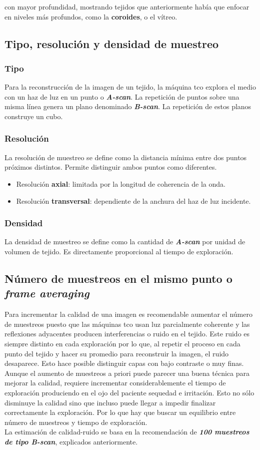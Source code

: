 con mayor profundidad, mostrando tejidos que anteriormente
había que enfocar en niveles más profundos, como la
\textbf{\gls{coroides}}, o el vítreo.

\subsection{Tipo, resolución y densidad de muestreo}
\subsubsection{Tipo}
Para la reconstrucción de la imagen de un tejido, la máquina \gls{tco}
explora el medio con un haz de luz en un punto o
\emph{\textbf{A-scan}}. La repetición de puntos sobre una misma línea
genera un plano denominado \emph{\textbf{B-scan}}. La repetición de
estos planos construye un cubo.
\subsubsection{Resolución}
La resolución de muestreo se define como la distancia mínima entre dos
puntos próximos distintos. Permite distinguir ambos puntos como
diferentes.
\begin{itemize}
\item Resolución \textbf{axial}: limitada por la longitud de
  coherencia de la onda.
\item Resolución \textbf{transversal}: dependiente de la anchura del
  haz de luz incidente.
\end{itemize}
\subsubsection{Densidad}
La densidad de muestreo se define como la cantidad de
\emph{\textbf{A-scan}} por unidad de volumen de tejido. Es
directamente proporcional al tiempo de exploración.

\subsection{Número de muestreos en el mismo punto o \emph{frame
    averaging}}
Para incrementar la calidad de una imagen es recomendable aumentar el
número de muestreos puesto que las máquinas \gls{tco} usan luz
parcialmente coherente y las reflexiones adyacentes producen
interferencias o ruido en el tejido. Este ruido es siempre distinto en
cada exploración por lo que, al repetir el proceso en cada punto del
tejido y hacer su promedio para reconstruir la imagen, el ruido
desaparece. Esto hace posible distinguir capas con bajo contraste o
muy finas.\\
Aunque el aumento de muestreos a priori puede parecer una buena
técnica para mejorar la calidad, requiere incrementar
considerablemente el tiempo de exploración produciendo en el ojo del
paciente sequedad e irritación. Esto no sólo disminuye la calidad sino
que incluso puede llegar a impedir finalizar correctamente la
exploración. Por lo que hay que buscar un equilibrio entre número de
muestreos y tiempo de exploración.\\
La estimación de calidad-ruido se basa en la recomendación de
\emph{\textbf{100 muestreos de tipo B-scan}}, explicados
anteriormente.

